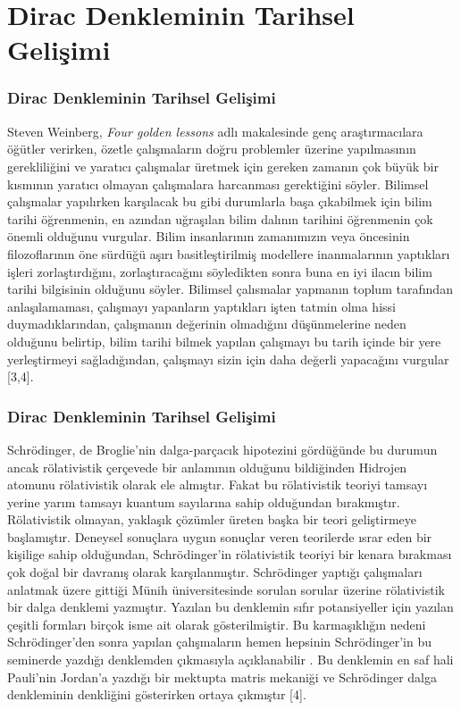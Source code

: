 \documentclass[aspectratio=169,10pt]{beamer}
\begin{document}
	\section{Dirac Denkleminin Tarihsel Gelişimi}
	
	
	\begin{frame}[allowframebreaks]
\frametitle{Dirac Denkleminin Tarihsel Gelişimi}

Steven Weinberg, \textit{Four golden lessons} adlı makalesinde genç araştırmacılara öğütler verirken, özetle çalışmaların doğru problemler üzerine yapılmasının gerekliliğini
ve yaratıcı çalışmalar üretmek için gereken zamanın çok büyük bir kısmının
yaratıcı olmayan çalışmalara harcanması gerektiğini söyler. Bilimsel çalışmalar
yapılırken karşılacak bu gibi durumlarla başa çıkabilmek için bilim tarihi
öğrenmenin, en azından uğraşılan bilim dalının tarihini öğrenmenin çok önemli
olduğunu vurgular. Bilim insanlarının zamanımızın veya öncesinin filozoflarının
öne sürdüğü aşırı basitleştirilmiş modellere inanmalarının yaptıkları işleri
zorlaştırdığını, zorlaştıracağını söyledikten sonra buna en iyi ilacın bilim tarihi
bilgisinin olduğunu söyler. Bilimsel çalısmalar yapmanın toplum tarafından
anlaşılamaması, çalışmayı yapanların yaptıkları işten tatmin olma hissi
duymadıklarından, çalışmanın değerinin olmadığını düşünmelerine neden
olduğunu belirtip, bilim tarihi bilmek yapılan çalışmayı bu tarih içinde bir yere
yerleştirmeyi sağladığından, çalışmayı sizin için daha değerli yapacağını vurgular [3,4].



\end{frame}
	
	
	
\begin{frame}[allowframebreaks]
\frametitle{Dirac Denkleminin Tarihsel Gelişimi}

Schrödinger, de Broglie’nin dalga-parçacık hipotezini gördüğünde bu durumun ancak rölativistik çerçevede bir anlamının olduğunu bildiğinden Hidrojen atomunu rölativistik olarak ele almıştır. Fakat bu rölativistik teoriyi tamsayı yerine yarım tamsayı kuantum sayılarına sahip olduğundan bırakmıştır. Rölativistik olmayan, yaklaşık çözümler üreten başka bir teori geliştirmeye
başlamıştır. Deneysel sonuçlara uygun sonuçlar veren teorilerde ısrar eden bir kişilige sahip olduğundan, Schrödinger’in rölativistik teoriyi bir kenara bırakması çok doğal bir davranış olarak karşılanmıştır. Schrödinger yaptığı çalışmaları anlatmak üzere gittiği Münih üniversitesinde sorulan sorular üzerine rölativistik bir dalga denklemi yazmıştır. Yazılan bu
denklemin sıfır potansiyeller için yazılan çeşitli formları birçok isme ait olarak
gösterilmiştir. Bu karmaşıklığın nedeni Schrödinger’den sonra yapılan çalışmaların hemen hepsinin Schrödinger’in bu seminerde yazdığı denklemden çıkmasıyla açıklanabilir . Bu denklemin en saf hali Pauli’nin Jordan’a yazdığı bir mektupta matris mekaniği ve Schrödinger dalga denkleminin
denkliğini gösterirken ortaya çıkmıştır [4].



\end{frame}
\end{document}

